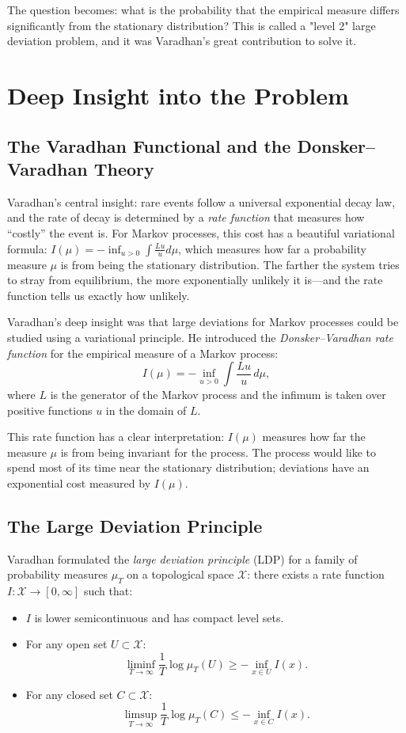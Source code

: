 The question becomes: what is the probability that the empirical measure differs significantly from the stationary distribution? This is called a "level 2" large deviation problem, and it was Varadhan's great contribution to solve it.

\section{Deep Insight into the Problem}

\subsection{The Varadhan Functional and the Donsker--Varadhan Theory}

\begin{bigidea}
Varadhan's central insight: rare events follow a universal exponential decay law, and the rate of decay is determined by a \emph{rate function} that measures how ``costly'' the event is. For Markov processes, this cost has a beautiful variational formula: $I(\mu) = -\inf_{u>0} \int \frac{Lu}{u} d\mu$, which measures how far a probability measure $\mu$ is from being the stationary distribution. The farther the system tries to stray from equilibrium, the more exponentially unlikely it is---and the rate function tells us exactly how unlikely.
\end{bigidea}

Varadhan's deep insight was that large deviations for Markov processes could be studied using a variational principle. He introduced the \emph{Donsker--Varadhan rate function} for the empirical measure of a Markov process:
\[
I(\mu) = -\inf_{u > 0} \int \frac{Lu}{u} \, d\mu,
\]
where $L$ is the generator of the Markov process and the infimum is taken over positive functions $u$ in the domain of $L$.

This rate function has a clear interpretation: $I(\mu)$ measures how far the measure $\mu$ is from being invariant for the process. The process would like to spend most of its time near the stationary distribution; deviations have an exponential cost measured by $I(\mu)$.

\subsection{The Large Deviation Principle}

Varadhan formulated the \emph{large deviation principle} (LDP) for a family of probability measures $\mu_T$ on a topological space $\mathcal{X}$: there exists a rate function $I: \mathcal{X} \to [0, \infty]$ such that:
\begin{itemize}
\item $I$ is lower semicontinuous and has compact level sets.
\item For any open set $U \subset \mathcal{X}$:
\[
\liminf_{T \to \infty} \frac{1}{T} \log \mu_T(U) \geq -\inf_{x \in U} I(x).
\]
\item For any closed set $C \subset \mathcal{X}$:
\[
\limsup_{T \to \infty} \frac{1}{T} \log \mu_T(C) \leq -\inf_{x \in C} I(x).
\]
\end{itemize}

